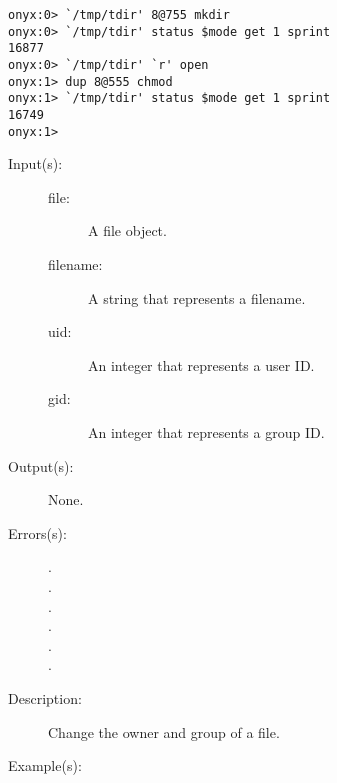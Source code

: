 \begin{description}
\begin{description}
\begin{verbatim}
onyx:0> `/tmp/tdir' 8@755 mkdir
onyx:0> `/tmp/tdir' status $mode get 1 sprint
16877
onyx:0> `/tmp/tdir' `r' open
onyx:1> dup 8@555 chmod
onyx:1> `/tmp/tdir' status $mode get 1 sprint
16749
onyx:1>
		\end{verbatim}
	\end{description}
\label{systemdict:chown}
\item[{\onyxop{file/filename uid gid}{chown}{--}}: ]
	\begin{description}\item[]
	\item[Input(s): ]
		\begin{description}\item[]
		\item[file: ]
			A file object.
		\item[filename: ]
			A string that represents a filename.
		\item[uid: ]
			An integer that represents a user ID.
		\item[gid: ]
			An integer that represents a group ID.
		\end{description}
	\item[Output(s): ] None.
	\item[Errors(s): ]
		\begin{description}\item[]
		\item[.]
		\item[.]
		\item[.]
		\item[.]
		\item[.]
		\item[.]
		\end{description}
	\item[Description: ]
		Change the owner and group of a file.
	\item[Example(s): ]\begin{verbatim}


\end{verbatim}
\end{description}
\end{description}
